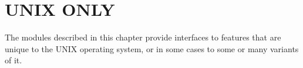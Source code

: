 \chapter{UNIX ONLY}

The modules described in this chapter provide interfaces to features
that are unique to the UNIX operating system, or in some cases to
some or many variants of it.
